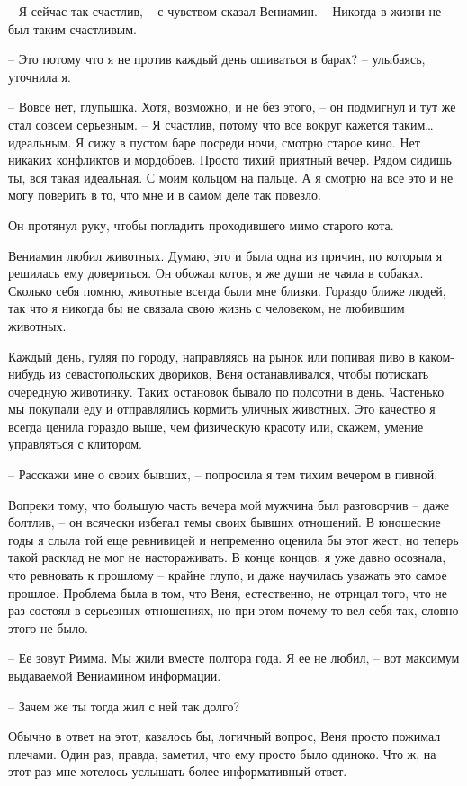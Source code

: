 \documentclass[
]{book}
\begin{document}
-- Я сейчас так счастлив, -- с чувством сказал Вениамин. -- Никогда в жизни не был таким счастливым.

-- Это потому что я не против каждый день ошиваться в барах? -- улыбаясь, уточнила я.

-- Вовсе нет, глупышка. Хотя, возможно, и не без этого, -- он подмигнул и тут же стал совсем серьезным. -- Я счастлив, потому что все вокруг кажется таким\ldots{} идеальным. Я сижу в пустом баре посреди ночи, смотрю старое кино. Нет никаких конфликтов и мордобоев. Просто тихий приятный вечер. Рядом сидишь ты, вся такая идеальная. С моим кольцом на пальце. А я смотрю на все это и не могу поверить в то, что мне и в самом деле так повезло.

Он протянул руку, чтобы погладить проходившего мимо старого кота.

Вениамин любил животных. Думаю, это и была одна из причин, по которым я решилась ему довериться. Он обожал котов, я же души не чаяла в собаках. Сколько себя помню, животные всегда были мне близки. Гораздо ближе людей, так что я никогда бы не связала свою жизнь с человеком, не любившим животных.

Каждый день, гуляя по городу, направляясь на рынок или попивая пиво в каком-нибудь из севастопольских двориков, Веня останавливался, чтобы потискать очередную животинку. Таких остановок бывало по полсотни в день. Частенько мы покупали еду и отправлялись кормить уличных животных. Это качество я всегда ценила гораздо выше, чем физическую красоту или, скажем, умение управляться с клитором.

-- Расскажи мне о своих бывших, -- попросила я тем тихим вечером в пивной.

Вопреки тому, что большую часть вечера мой мужчина был разговорчив -- даже болтлив, -- он всячески избегал темы своих бывших отношений. В юношеские годы я слыла той еще ревнивицей и непременно оценила бы этот жест, но теперь такой расклад не мог не настораживать. В конце концов, я уже давно осознала, что ревновать к прошлому -- крайне глупо, и даже научилась уважать это самое прошлое. Проблема была в том, что Веня, естественно, не отрицал того, что не раз состоял в серьезных отношениях, но при этом почему-то вел себя так, словно этого не было.

-- Ее зовут Римма. Мы жили вместе полтора года. Я ее не любил, -- вот максимум выдаваемой Вениамином информации.

-- Зачем же ты тогда жил с ней так долго?

Обычно в ответ на этот, казалось бы, логичный вопрос, Веня просто пожимал плечами. Один раз, правда, заметил, что ему просто было одиноко. Что ж, на этот раз мне хотелось услышать более информативный ответ.
\end{document}
